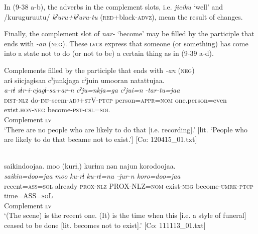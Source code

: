In (9-38 a-b), the adverbs in the complement slots, i.e. \textit{jiciku} ‘well’ and /kuruguruutu/ \textit{kˀuru+kˀuru-tu} (\textsc{red}+black-\textsc{advz}), mean the result of changes.

Finally, the complement slot of \textit{nar-} ‘become’ may be filled by the participle that ends with \textit{{}-an} (\textsc{neg}). These \textsc{lvc}s express that someone (or something) has come into a state not to do (or not to be) a certain thing as in (9-39 a-d).

\ea   Complements filled by the participle that ends with \textit{{}-an} (\textsc{neg}) \label{ex:9.39}
 \ea{}\\
    \gllll  arɨ  siicjagɨsan  cˀjunkjaga   cˀjuin  umooran  natattujaa.\\
      \textit{a-rɨ}  \textit{sɨr-i-cjagɨ-sa+ar-n}  \textit{cˀju=nkja=ga} \textit{cˀjui=n}  \textit{}  \textit{-tar-tu=jaa}\\
      \textsc{dist}-\textsc{nlz}  do-\textsc{inf}-seem-\textsc{adj}+\textsc{st}V-\textsc{ptcp}  person=\textsc{appr}=\textsc{nom}  one.person=even  exist.\textsc{hon}-\textsc{neg}  become-\textsc{pst}-\textsc{csl}=\textsc{sol}\\
                                                             Complement  \textsc{lv}\\
      \glt       ‘There are no people who are likely to do that [i.e. recording].’ [lit. ‘People who are likely to do that became not to exist.’] [Co: 120415\_01.txt]

  \ex{}\\
    \gllll {\textbar}saikin{\textbar}doojaa.  {\textbar}moo{\textbar}  (kurɨ,)  kurɨnu  nən  najun  {\textbar}koro{\textbar}doojaa.\\
      \textit{saikin=doo=jaa}  \textit{moo}  \textit{ku-rɨ}  \textit{ku-rɨ=nu}  \textit{}  \textit{-jur-n  koro=doo=jaa}\\
      recent=\textsc{ass}=\textsc{sol}  already  \textsc{prox}-\textsc{nlz}  PROX-NLZ=\textsc{nom}  exist-\textsc{neg}  become-\textsc{umrk}-\textsc{ptcp}  time=ASS=\textsc{so}L\\
          {}             {}        {}          {}          Complement  \textsc{lv} \\
      \glt ‘(The scene) is the recent one. (It) is the time when this [i.e. a style of funeral] ceased to be done [lit. becomes not to exist].’   [Co: 111113\_01.txt]

